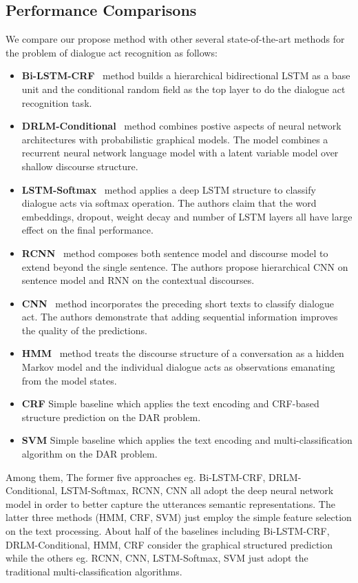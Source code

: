 \documentclass[sigconf]{acmart}
\begin{document}
\subsection{Performance Comparisons}
We compare our propose method with other several state-of-the-art methods for the problem of dialogue act recognition as follows:
\begin{itemize}
	\item \textbf{Bi-LSTM-CRF}~\cite{Kumar2017Dialogue} method builds a hierarchical bidirectional LSTM as a base unit and the conditional random field as the top layer to do the dialogue act recognition task.
	\item \textbf{DRLM-Conditional}~\cite{ji2016latent} method combines postive aspects of neural network architectures with probabilistic graphical models. The model combines a recurrent neural network language model with a latent variable model over shallow discourse structure.
	\item \textbf{LSTM-Softmax}~\cite{Khanpour2016Dialogue} method applies a deep LSTM structure to classify dialogue acts via softmax operation. The authors claim that the word embeddings, dropout, weight decay and number of LSTM layers all have large effect on the final performance. 
	\item \textbf{RCNN}~\cite{blunsom2013recurrent} method composes both sentence model and discourse model to extend beyond the single sentence. The authors propose hierarchical CNN on sentence model and RNN on the contextual discourses.
	\item \textbf{CNN}~\cite{lee2016sequential} method incorporates the preceding short texts to classify dialogue act. The authors demonstrate that adding sequential information improves the quality of the predictions.
	\item \textbf{HMM}~\cite{stolcke2006dialogue} method treats the discourse structure of a conversation as a hidden Markov model and the individual dialogue acts as observations emanating from the model states.
	\item \textbf{CRF} Simple baseline which applies the text encoding and CRF-based structure prediction on the DAR problem.
	\item \textbf{SVM} Simple baseline which applies the text encoding and multi-classification algorithm on the DAR problem.
	
\end{itemize}
Among them, The former five approaches eg. Bi-LSTM-CRF, DRLM-Conditional, LSTM-Softmax, RCNN, CNN all adopt the deep neural network model in order to better capture the utterances semantic representations. The latter three methods (HMM, CRF, SVM) just employ the simple feature selection on the text processing. About half of the baselines including Bi-LSTM-CRF, DRLM-Conditional, HMM, CRF consider the graphical structured prediction while the others eg. RCNN, CNN, LSTM-Softmax, SVM just adopt the traditional multi-classification algorithms.
\end{document}
